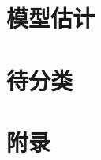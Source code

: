 \documentclass[10pt,a4paper,UTF8]{ctexbook}
\begin{document}
\part{模型估计}


\part{待分类}


\part{附录}
\begin{appendices}
\appendixpage
\noappendicestocpagenum
\addappheadtotoc



\end{appendices}
\newpage{}

%

\listoffigures
\listoftables
\listoftodos
\printindex
\end{document}
